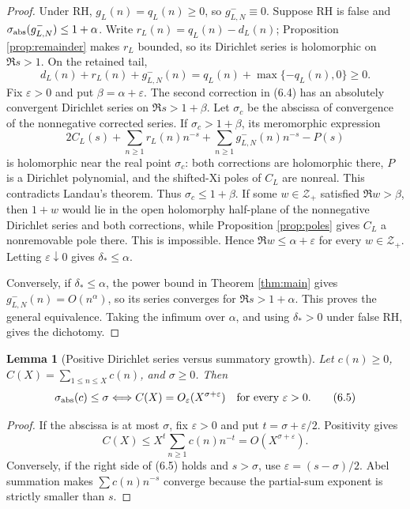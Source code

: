 \documentclass[11pt]{article}
\newtheorem{lemma}[theorem]{Lemma}
\newcommand{\cZ}{\mathcal Z}
\begin{document}
\begin{proof}
Under RH, \(g_L(n)=q_L(n)\ge0\), so \(g^-_{L,N}\equiv0\).
Suppose RH is false and \(\sigma_{\rm abs}(g^-_{L,N})\le1+\alpha\).  Write
\(r_L(n)=q_L(n)-d_L(n)\); Proposition \ref{prop:remainder} makes \(r_L\) bounded, so its
Dirichlet series is holomorphic on \(\Re s>1\).  On the retained tail,
\[
 d_L(n)+r_L(n)+g^-_{L,N}(n)
 =q_L(n)+\max\{-q_L(n),0\}\ge0.
\tag{6.4}
\]
Fix \(\varepsilon>0\) and put \(\beta=\alpha+\varepsilon\).  The second correction in (6.4)
has an absolutely convergent Dirichlet series on \(\Re s>1+\beta\).  Let \(\sigma_c\) be the
abscissa of convergence of the nonnegative corrected series.  If
\(\sigma_c>1+\beta\), its meromorphic expression
\[
 2C_L(s)+\sum_{n\ge1}r_L(n)n^{-s}
       +\sum_{n\ge1}g^-_{L,N}(n)n^{-s}-P(s)
\]
is holomorphic near the real point \(\sigma_c\): both corrections are holomorphic there, \(P\)
is a Dirichlet polynomial, and the shifted-Xi poles of \(C_L\) are nonreal.  This contradicts
Landau's theorem.  Thus \(\sigma_c\le1+\beta\).  If some \(w\in\cZ_+\) satisfied
\(\Re w>\beta\), then \(1+w\) would lie in the open holomorphy half-plane of the nonnegative
Dirichlet series and both corrections, while Proposition \ref{prop:poles} gives \(C_L\) a
nonremovable pole there.  This is impossible.  Hence \(\Re w\le\alpha+\varepsilon\) for every
\(w\in\cZ_+\).  Letting \(\varepsilon\downarrow0\) gives \(\delta_*\le\alpha\).

Conversely, if \(\delta_*\le\alpha\), the power bound in Theorem \ref{thm:main} gives
\(g^-_{L,N}(n)=O(n^\alpha)\), so its series converges for \(\Re s>1+\alpha\).  This proves
the general equivalence.  Taking the infimum over \(\alpha\), and using \(\delta_*>0\) under
false RH, gives the dichotomy.
\end{proof}

\begin{lemma}[Positive Dirichlet series versus summatory growth]\label{lem:abel}
Let \(c(n)\ge0\), \(C(X)=\sum_{1\le n\le X}c(n)\), and \(\sigma\ge0\).  Then
\[
 \sigma_{\rm abs}(c)\le\sigma
 \Longleftrightarrow
 C(X)=O_\varepsilon(X^{\sigma+\varepsilon})
 \quad\text{for every }\varepsilon>0.
\tag{6.5}
\]
\end{lemma}

\begin{proof}
If the abscissa is at most \(\sigma\), fix \(\varepsilon>0\) and put
\(t=\sigma+\varepsilon/2\).  Positivity gives
\[
 C(X)\le X^t\sum_{n\ge1}c(n)n^{-t}
 =O(X^{\sigma+\varepsilon}).
\tag{6.6}
\]
Conversely, if the right side of (6.5) holds and \(s>\sigma\), use
\(\varepsilon=(s-\sigma)/2\).  Abel summation makes
\(\sum c(n)n^{-s}\) converge because the partial-sum exponent is strictly smaller than \(s\).
\end{proof}
\end{document}
